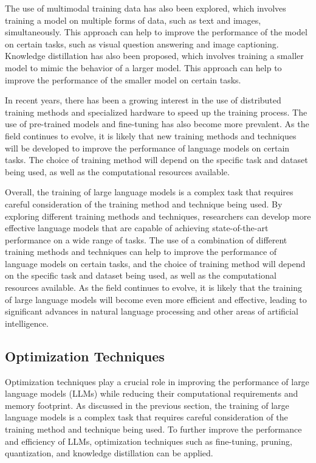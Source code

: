 \documentclass[11pt]{article}
\begin{document}
The use of multimodal training data \cite{ref78} has also been explored, which involves training a model on multiple forms of data, such as text and images, simultaneously. This approach can help to improve the performance of the model on certain tasks, such as visual question answering and image captioning. Knowledge distillation \cite{ref69} has also been proposed, which involves training a smaller model to mimic the behavior of a larger model. This approach can help to improve the performance of the smaller model on certain tasks.

In recent years, there has been a growing interest in the use of distributed training methods \cite{ref73} and specialized hardware \cite{ref79} to speed up the training process. The use of pre-trained models \cite{ref66} and fine-tuning \cite{ref72} has also become more prevalent. As the field continues to evolve, it is likely that new training methods and techniques will be developed to improve the performance of language models on certain tasks. The choice of training method will depend on the specific task and dataset being used, as well as the computational resources available.

Overall, the training of large language models is a complex task that requires careful consideration of the training method and technique being used. By exploring different training methods and techniques, researchers can develop more effective language models that are capable of achieving state-of-the-art performance on a wide range of tasks. The use of a combination of different training methods and techniques can help to improve the performance of language models on certain tasks, and the choice of training method will depend on the specific task and dataset being used, as well as the computational resources available. As the field continues to evolve, it is likely that the training of large language models will become even more efficient and effective, leading to significant advances in natural language processing and other areas of artificial intelligence.

\subsection{Optimization Techniques}

Optimization techniques play a crucial role in improving the performance of large language models (LLMs) while reducing their computational requirements and memory footprint. As discussed in the previous section, the training of large language models is a complex task that requires careful consideration of the training method and technique being used. To further improve the performance and efficiency of LLMs, optimization techniques such as fine-tuning, pruning, quantization, and knowledge distillation can be applied.
\end{document}
